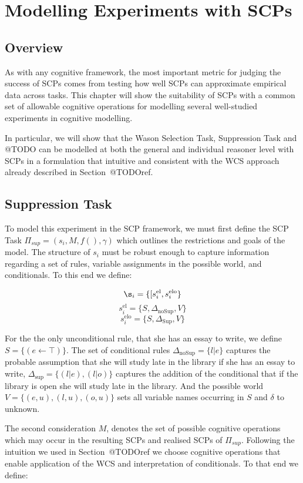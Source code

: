 \chapter{Modelling Experiments with SCPs} \label{chp:model}
\section{Overview}
As with any cognitive framework, the most important metric for judging the success of SCPs comes from testing how well SCPs can approximate empirical data across tasks. This chapter will show the suitability of SCPs with a common set of allowable cognitive operations for modelling several well-studied experiments in cognitive modelling.

In particular, we will show that the Wason Selection Task, Suppression Task and @TODO can be modelled at both the general and individual reasoner level with SCPs in a formulation that intuitive and consistent with the WCS approach already described in Section~@TODOref.
\section{Suppression Task} \label{sec:supSCP}



To model this experiment in the SCP framework, we must first define the SCP Task $\Pi_{sup}=(s_i,M,f(),\gamma)$ which outlines the restrictions and goals of the model. The structure of $s_i$ must be robust enough to capture information regarding a set of rules, variable assignments in the possible world, and conditionals. To this end we define:

\[\s_i=\{[s_i^\text{el},s_i^\text{elo}\}\]
\[s_i^\text{el}=\{S,\Delta_\text{noSup}, V\} \]
\[s_i^\text{elo}=\{S,\Delta_\text{Sup}, V\} \]




For the the only unconditional rule, that she has an essay to write, we define $S=\{(e \leftarrow \top)\}$. The set of conditional rules $\Delta_{\text{noSup}}=\{l|e\}$ captures the probable assumption that she will study late in the library if she has an essay to write, $\Delta_{\text{sup}}=\{(l|e),(l|o)\}$ captures the addition of the conditional that if the library is open she will study late in the library. And the possible world $V=\{(e,u),(l,u),(o,u)\}$ sets all variable names occurring in $S$ and $\delta$ to unknown.

The second consideration $M$, denotes the set of possible cognitive operations which may occur in the resulting SCPs and realised SCPs of $\Pi_{sup}$. Following the intuition we used in Section~@TODOref we choose cognitive operations that enable application of the WCS and interpretation of conditionals. To that end we define:

